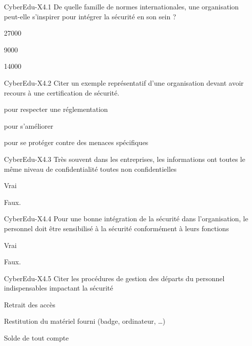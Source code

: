 
  
\begin{multi}[multiple=true]{CyberEdu-X4.1}
De quelle famille de normes internationales, une organisation peut-elle s'inspirer pour intégrer la sécurité en son sein ?
\item*27000
\item 9000
\item 14000
\end{multi}
\begin{multi}[multiple=true]{CyberEdu-X4.2}
	Citer un exemple représentatif d'une organisation devant avoir recours à une certification de sécurité. 
\item* pour respecter une réglementation
\item* pour s'améliorer
\item pour se protéger contre des menaces spécifiques
\end{multi}

\begin{multi}[multiple=true]{CyberEdu-X4.3}
Très souvent dans les entreprises, les informations ont toutes le même niveau de confidentialité  toutes non confidentielles  
\item  Vrai 
\item* Faux.
\end{multi}

\begin{multi}[multiple=true]{CyberEdu-X4.4}
Pour une bonne intégration de la sécurité dans l'organisation, le personnel doit être sensibilisé à la sécurité conformément à leurs fonctions 
\item* Vrai 
\item Faux.
\end{multi}


\begin{multi}[multiple=true]{CyberEdu-X4.5}
Citer les procédures de gestion des départs du personnel indispensables impactant la sécurité 
\item* Retrait des accès 
\item* Restitution du matériel fourni (badge, ordinateur, …)
\item Solde de tout compte
\end{multi}


